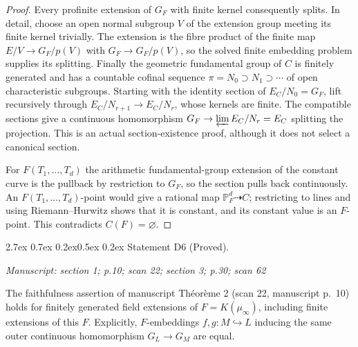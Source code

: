 \documentclass[11pt,a4paper]{article}
\makeatletter
\newcommand{\passage}[1]{\par\smallskip\noindent\textit{Manuscript: #1}\par\smallskip}
\renewcommand\paragraph{\@startsection{paragraph}{4}{\z@}%
  {2.7ex \@plus 0.7ex \@minus 0.2ex}{0.5ex \@plus 0.2ex}%
  {\normalfont\normalsize\bfseries}}
\makeatother
\begin{document}
\begin{proof}
Every profinite extension of $G_F$ with finite kernel consequently
splits.  In detail, choose an open normal subgroup $V$ of the extension
group meeting its finite kernel trivially.  The extension is the fibre
product of the finite map $E/V\to G_F/p(V)$ with
$G_F\to G_F/p(V)$, so the solved finite embedding problem supplies its
splitting.  Finally the geometric fundamental group of $C$ is finitely
generated and has a countable cofinal sequence
$\pi=N_0\supset N_1\supset\cdots$ of open characteristic subgroups.
Starting with the identity section of $E_C/N_0=G_F$, lift recursively
through $E_C/N_{r+1}\to E_C/N_r$, whose kernels are finite.
The compatible sections give a continuous homomorphism
$G_F\to\varprojlim E_C/N_r=E_C$ splitting the projection.  This is an
actual section-existence proof, although it does not select a canonical
section.

For $F(T_1,\ldots,T_d)$ the arithmetic fundamental-group extension of
the constant curve is the pullback by restriction to $G_F$, so the
section pulls back continuously.  An $F(T_1,\ldots,T_d)$-point would
give a rational map $\mathbb P^d_F\dashrightarrow C$; restricting to
lines and using Riemann--Hurwitz shows that it is constant, and its
constant value is an $F$-point.  This contradicts $C(F)=\varnothing$.
\end{proof}

\paragraph{Statement D6 (Proved).}\label{res:D6}
\passage{section 1; p.10; scan 22; section 3; p.30; scan 62}

The faithfulness assertion of manuscript Th\'eor\`eme 2 (scan 22,
manuscript p.~10) holds for finitely generated field extensions of
$F=K(\mu_\infty)$, including finite extensions of this $F$.
Explicitly, $F$-embeddings $f,g:M\hookrightarrow L$ inducing the same
outer continuous homomorphism $G_L\to G_M$ are equal.
\end{document}
